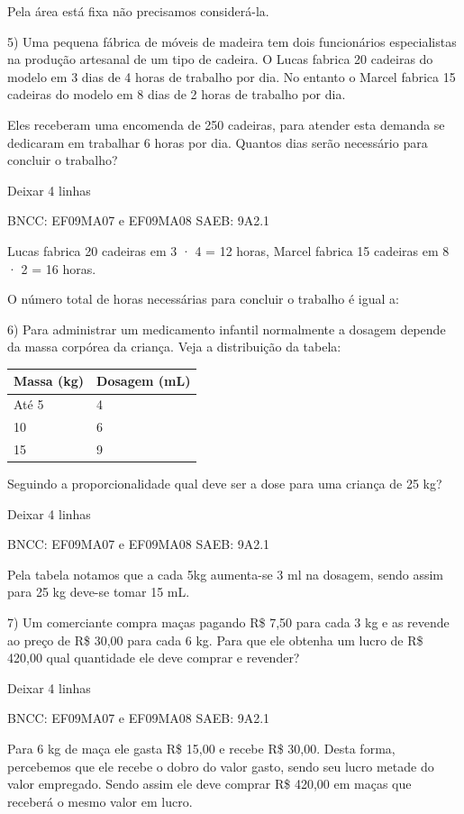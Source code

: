 \begin{escolha}
{{{\begin{escolha}
{Pela área está fixa não precisamos considerá-la.

5) Uma pequena fábrica de móveis de madeira tem dois funcionários
especialistas na produção artesanal de um tipo de cadeira. O Lucas
fabrica 20 cadeiras do modelo em 3 dias de 4 horas de trabalho por dia.
No entanto o Marcel fabrica 15 cadeiras do modelo em 8 dias de 2 horas
de trabalho por dia.

Eles receberam uma encomenda de 250 cadeiras, para atender esta demanda
se dedicaram em trabalhar 6 horas por dia. Quantos dias serão necessário
para concluir o trabalho?

Deixar 4 linhas

BNCC: EF09MA07 e EF09MA08 SAEB: 9A2.1

Lucas fabrica 20 cadeiras em 3 · 4 = 12 horas, Marcel fabrica 15
cadeiras em 8 · 2 = 16 horas.

O número total de horas necessárias para concluir o trabalho é igual a:

6) Para administrar um medicamento infantil normalmente a dosagem
depende da massa corpórea da criança. Veja a distribuição da tabela:

\begin{longtable}[]{@{}ll@{}}
\toprule\noalign{}
\textbf{Massa (kg)} & \textbf{Dosagem (mL)} \\
\midrule\noalign{}
\endhead
\bottomrule\noalign{}
\endlastfoot
Até 5 & 4 \\
10 & 6 \\
15 & 9 \\
\end{longtable}

Seguindo a proporcionalidade qual deve ser a dose para uma criança de 25
kg?

Deixar 4 linhas

BNCC: EF09MA07 e EF09MA08 SAEB: 9A2.1

Pela tabela notamos que a cada 5kg aumenta-se 3 ml na dosagem, sendo
assim para 25 kg deve-se tomar 15 mL.

7) Um comerciante compra maças pagando R\$ 7,50 para cada 3 kg e as
revende ao preço de R\$ 30,00 para cada 6 kg. Para que ele obtenha um
lucro de R\$ 420,00 qual quantidade ele deve comprar e revender?

Deixar 4 linhas

BNCC: EF09MA07 e EF09MA08 SAEB: 9A2.1

Para 6 kg de maça ele gasta R\$ 15,00 e recebe R\$ 30,00. Desta forma,
percebemos que ele recebe o dobro do valor gasto, sendo seu lucro metade
do valor empregado. Sendo assim ele deve comprar R\$ 420,00 em maças que
receberá o mesmo valor em lucro.

}
\end{escolha}}}}
\end{escolha}
